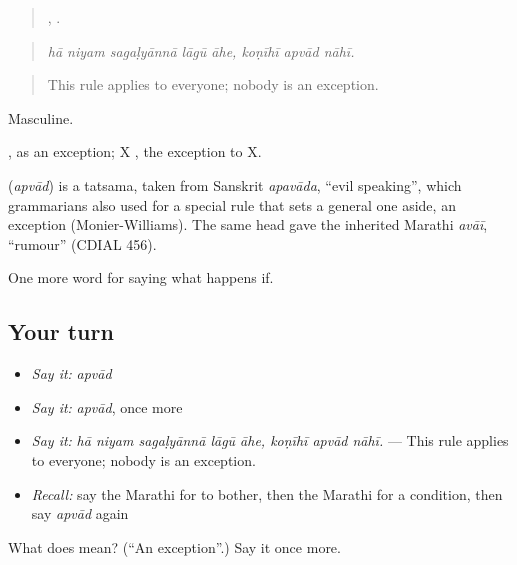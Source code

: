 \begin{quote}
    ,   .
\end{quote}

\begin{quote}
\emph{hā niyam sagaḷyānnā lāgū āhe, koṇīhī apvād nāhī.}
\end{quote}

\begin{quote}
This rule applies to everyone; nobody is an exception.
\end{quote}

Masculine.

, as an exception; X  , the exception to X.

\begin{cousinweb}
\textbf{} (\emph{apvād}) is a tatsama, taken from Sanskrit \emph{apavāda}, \textquotedblleft{}evil speaking\textquotedblright{}, which grammarians also used for a special rule that sets a general one aside, an exception (Monier-Williams). The same head gave the inherited Marathi \emph{avāī}, \textquotedblleft{}rumour\textquotedblright{} (CDIAL 456).
\end{cousinweb}

\begin{grammarlens}[title={What you've built}]
One more word for saying what happens if.
\end{grammarlens}

\subsection*{Your turn}
\begin{itemize}
\raggedright
  \item \emph{Say it:} \emph{apvād}
  \item \emph{Say it:} \emph{apvād}, once more
  \item \emph{Say it:} \emph{hā niyam sagaḷyānnā lāgū āhe, koṇīhī apvād nāhī.} — This rule applies to everyone; nobody is an exception.
  \item \emph{Recall:} say the Marathi for to bother, then the Marathi for a condition, then say \emph{apvād} again
\end{itemize}

\begin{tcolorbox}[breakable,colback=teal!4,colframe=teal!35!black,title={Before you move on}]
What does  mean? (\textquotedblleft{}An exception\textquotedblright{}.) Say it once more.
\end{tcolorbox}
